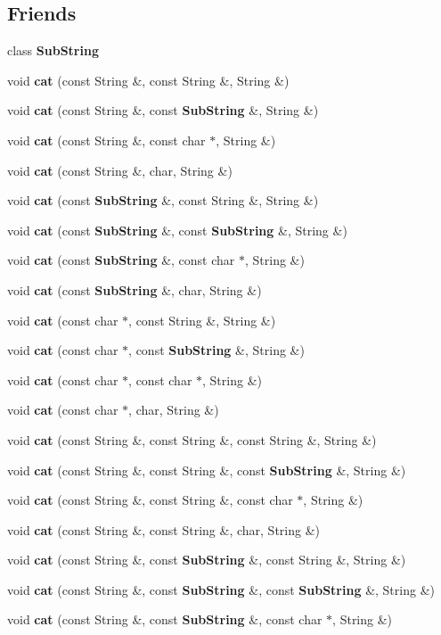 \subsection*{Friends}
\begin{CompactItemize}
\item 
class {\bf Sub\-String}
\item 
void {\bf cat} (const String \&, const String \&, String \&)
\item 
void {\bf cat} (const String \&, const {\bf Sub\-String} \&, String \&)
\item 
void {\bf cat} (const String \&, const char $\ast$, String \&)
\item 
void {\bf cat} (const String \&, char, String \&)
\item 
void {\bf cat} (const {\bf Sub\-String} \&, const String \&, String \&)
\item 
void {\bf cat} (const {\bf Sub\-String} \&, const {\bf Sub\-String} \&, String \&)
\item 
void {\bf cat} (const {\bf Sub\-String} \&, const char $\ast$, String \&)
\item 
void {\bf cat} (const {\bf Sub\-String} \&, char, String \&)
\item 
void {\bf cat} (const char $\ast$, const String \&, String \&)
\item 
void {\bf cat} (const char $\ast$, const {\bf Sub\-String} \&, String \&)
\item 
void {\bf cat} (const char $\ast$, const char $\ast$, String \&)
\item 
void {\bf cat} (const char $\ast$, char, String \&)
\item 
void {\bf cat} (const String \&, const String \&, const String \&, String \&)
\item 
void {\bf cat} (const String \&, const String \&, const {\bf Sub\-String} \&, String \&)
\item 
void {\bf cat} (const String \&, const String \&, const char $\ast$, String \&)
\item 
void {\bf cat} (const String \&, const String \&, char, String \&)
\item 
void {\bf cat} (const String \&, const {\bf Sub\-String} \&, const String \&, String \&)
\item 
void {\bf cat} (const String \&, const {\bf Sub\-String} \&, const {\bf Sub\-String} \&, String \&)
\item 
void {\bf cat} (const String \&, const {\bf Sub\-String} \&, const char $\ast$, String \&)
\item 

\end{CompactItemize}
